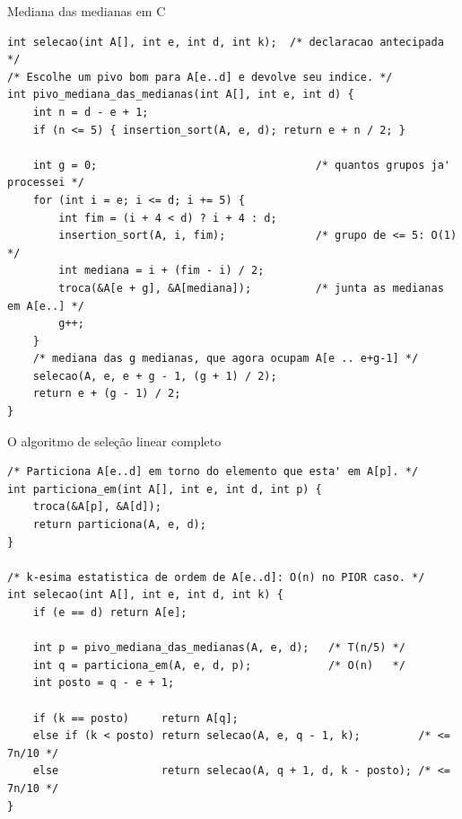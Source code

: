 \documentclass[aspectratio=169]{beamer}
\begin{document}
\begin{frame}[fragile,shrink=20]{Mediana das medianas em C}
\begin{lstlisting}
int selecao(int A[], int e, int d, int k);  /* declaracao antecipada */
/* Escolhe um pivo bom para A[e..d] e devolve seu indice. */
int pivo_mediana_das_medianas(int A[], int e, int d) {
    int n = d - e + 1;
    if (n <= 5) { insertion_sort(A, e, d); return e + n / 2; }

    int g = 0;                                  /* quantos grupos ja' processei */
    for (int i = e; i <= d; i += 5) {
        int fim = (i + 4 < d) ? i + 4 : d;
        insertion_sort(A, i, fim);              /* grupo de <= 5: O(1) */
        int mediana = i + (fim - i) / 2;
        troca(&A[e + g], &A[mediana]);          /* junta as medianas em A[e..] */
        g++;
    }
    /* mediana das g medianas, que agora ocupam A[e .. e+g-1] */
    selecao(A, e, e + g - 1, (g + 1) / 2);
    return e + (g - 1) / 2;
}
\end{lstlisting}
\end{frame}

\begin{frame}[fragile,shrink=20]{O algoritmo de seleção linear completo}
\begin{lstlisting}
/* Particiona A[e..d] em torno do elemento que esta' em A[p]. */
int particiona_em(int A[], int e, int d, int p) {
    troca(&A[p], &A[d]);
    return particiona(A, e, d);
}

/* k-esima estatistica de ordem de A[e..d]: O(n) no PIOR caso. */
int selecao(int A[], int e, int d, int k) {
    if (e == d) return A[e];

    int p = pivo_mediana_das_medianas(A, e, d);   /* T(n/5) */
    int q = particiona_em(A, e, d, p);            /* O(n)   */
    int posto = q - e + 1;

    if (k == posto)     return A[q];
    else if (k < posto) return selecao(A, e, q - 1, k);         /* <= 7n/10 */
    else                return selecao(A, q + 1, d, k - posto); /* <= 7n/10 */
}
\end{lstlisting}
\end{frame}
\end{document}
